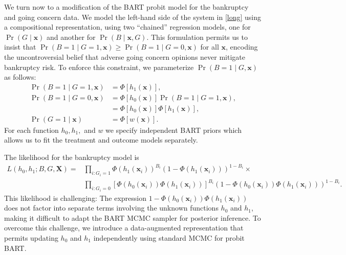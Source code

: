 \documentclass[aoas,preprint, 11pt, dvipsnames, table, x11name]{imsart}
\theoremstyle{remark}
\begin{document}
	We turn now to a modification of the BART probit model for the bankruptcy and going concern data. We model the left-hand side of the system in \autoref{long} using a compositional representation, using two ``chained'' regression models, one for $\Pr(G \mid \mathbf{x})$ and another for $\Pr(B \mid \mathbf{x}, G)$. This formulation permits us to insist that $\Pr(B=1\mid G=1, \mathbf{x}) \geq \Pr(B=1\mid G=0, \mathbf{x})$ for all $\mathbf{x}$, encoding the uncontroversial belief that adverse going concern opinions never mitigate bankruptcy risk. To enforce this constraint, we parameterize $\Pr(B=1\mid G, \mathbf{x})$ as follows:
	\begin{equation}
		\begin{split}
			\Pr(B=1\mid G=1, \mathbf{x}) &= \Phi[h_1(\mathbf{x})],\\
			\Pr(B=1\mid G=0, \mathbf{x}) &= \Phi[h_0(\mathbf{x})]\Pr(B=1\mid G=1, \mathbf{x}),
			\\ &= \Phi[h_0(\mathbf{x})]\Phi[h_1(\mathbf{x})],\\
			\Pr(G=1\mid \mathbf{x}) &= \Phi[w(\mathbf{x})].
		\end{split}
	\end{equation}
	For each function $h_0, h_1,$ and $w$ we specify independent BART priors which allows us to fit the treatment and outcome models separately. 
	
	The likelihood for the bankruptcy model is
	\begin{equation}
		\begin{split}
			L(h_0, h_1; B, G, \mathbf{X}) =&\prod_{i: G_i=1}\Phi(h_1(\mathbf{x}_i))^{B_i}(1-\Phi(h_1(\mathbf{x}_i)))^{1-B_i} \times \\
			&\prod_{i: G_i=0}[\Phi(h_0(\mathbf{x}_i))\Phi(h_1(\mathbf{x}_i))]^{B_i} (1-\Phi(h_0(\mathbf{x}_i))\Phi(h_1(\mathbf{x}_i)))^{1-B_i}\label{eq:bart-da0}.
		\end{split}
	\end{equation}
	This likelihood is challenging: The expression $1- \Phi(h_0(\mathbf{x}_i))\Phi(h_1(\mathbf{x}_i))$ does not factor into separate terms involving the unknown functions $h_0$ and $h_1$, making it difficult to adapt the BART MCMC sampler for posterior inference. To overcome this challenge, we introduce a data-augmented representation that permits updating $h_0$ and $h_1$ independently using standard MCMC for probit BART. 
	
\end{document}
